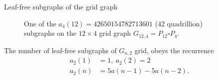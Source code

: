 \documentclass{beamer}%
\begin{document}
\begin{frame}{Leaf-free subgraphs of the grid graph} %
  \begin{figure}[!h]
    
    \caption {
      One of the $a_4(12) = 42 650 154 782 713 601$ ($42$ quadrillion) subgraphs on the $12 \times 4$ grid graph $G_{12,4} = P_{12} \square P_{4}$.
    }
  \end{figure}
  The number of leaf-free subgraphs of $G_{n,2}$ grid, obeys the recurrence
  \begin{align*}
    a_2(1) &= 1,\ a_2(2) = 2 \\
    a_2(n) &= 5a(n-1) - 5a(n-2).
  \end{align*}
\end{frame}
\end{document}
